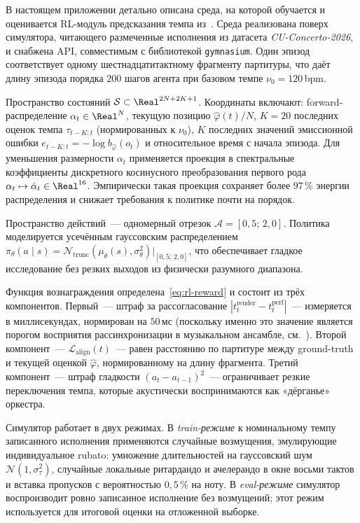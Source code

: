 %
В настоящем приложении детально описана среда, на которой обучается и
оценивается RL-модуль предсказания темпа из~. Среда
реализована поверх симулятора, читающего размеченные исполнения из
датасета \textit{CU-Concerto-2026}, и снабжена API, совместимым с
библиотекой \texttt{gymnasium}. Один эпизод соответствует одному
шестнадцатитактному фрагменту партитуры, что даёт длину эпизода
порядка $200$ шагов агента при базовом темпе $\nu_0=120$\,bpm.

Пространство состояний $\mathcal{S}\subset\Real^{2N+2K+1}$. Координаты
включают: forward-распределение $\alpha_t\in\Real^N$, текущую
позицию $\hat\varphi(t)/N$, $K=20$ последних оценок темпа
$\tau_{t-K:t}$ (нормированных к $\nu_0$), $K$ последних значений
эмиссионной ошибки $e_{t-K:t}=-\log b_{\hat\varphi}(o_t)$ и
относительное время с начала эпизода. Для уменьшения размерности
$\alpha_t$ применяется проекция в спектральные коэффициенты
дискретного косинусного преобразования первого рода
$\alpha_t\mapsto\hat\alpha_t\in\Real^{16}$. Эмпирически такая
проекция сохраняет более $97$\,\% энергии распределения и снижает
требования к политике почти на порядок.

Пространство действий~--- одномерный отрезок $\mathcal{A}=[0{,}5;\,2{,}0]$.
Политика моделируется усечённым гауссовским распределением
$\pi_\theta(a\mid s)=\mathcal{N}_{\text{trunc}}(\mu_\theta(s),
\sigma_\theta^2)\bigr|_{[0{,}5;\,2{,}0]}$, что обеспечивает
гладкое исследование без резких выходов из физически разумного
диапазона.

Функция вознаграждения определена~\eqref{eq:rl-reward} и состоит из
трёх компонентов. Первый~--- штраф за рассогласование
$|t^{\text{render}}_t-t^{\text{perf}}_t|$~--- измеряется в
миллисекундах, нормирован на $50$\,мс (поскольку именно это значение
является порогом восприятия рассинхронизации в музыкальном
ансамбле, см.~). Второй компонент~---
$\mathcal{L}_{\text{align}}(t)$~--- равен расстоянию по партитуре
между ground-truth и текущей оценкой $\hat\varphi$, нормированному
на длину фрагмента. Третий компонент~--- штраф гладкости
$(a_t-a_{t-1})^2$~--- ограничивает резкие переключения темпа,
которые акустически воспринимаются как «дёрганье» оркестра.

Симулятор работает в двух режимах. В \textit{train-режиме} к
номинальному темпу записанного исполнения применяются случайные
возмущения, эмулирующие индивидуальное rubato: умножение
длительностей на гауссовский шум $\mathcal{N}(1,\sigma_\tau^2)$,
случайные локальные ритардандо и ачелерандо в окне восьми тактов и
вставка пропусков с вероятностью $0{,}5$\,\% на ноту. В
\textit{eval-режиме} симулятор воспроизводит ровно записанное
исполнение без возмущений; этот режим используется для
итоговой оценки на отложенной выборке.

